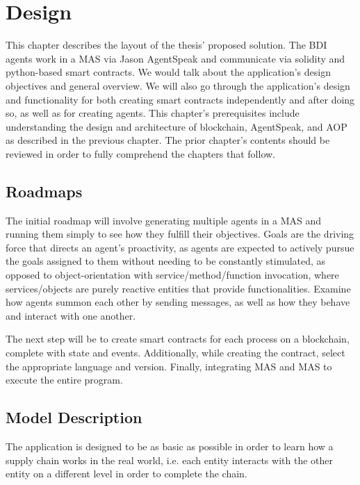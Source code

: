 \ifx\doclanguage\english
\chapter{Design}

This chapter describes the layout of the thesis' proposed solution. The \ac{BDI} agents work in a \ac{MAS} via Jason AgentSpeak and communicate via solidity and python-based smart contracts. We would talk about the application's design objectives and general overview. We will also go through the application's design and functionality for both creating smart contracts independently and after doing so, as well as for creating agents. This chapter's prerequisites include understanding the design and architecture of blockchain, AgentSpeak, and \ac{AOP} as described in the previous chapter. The prior chapter's contents should be reviewed in order to fully comprehend the chapters that follow.

\section{Roadmaps}

The initial roadmap will involve generating multiple agents in a \ac{MAS} and running them simply to see how they fulfill their objectives. Goals are the driving force that directs an agent's proactivity, as agents are expected to actively pursue the goals assigned to them without needing to be constantly stimulated, as opposed to object-orientation with service/method/function invocation, where services/objects are purely reactive entities that provide functionalities. Examine how agents summon each other by sending messages, as well as how they behave and interact with one another. 

\vspace{.5cm}

The next step will be to create smart contracts for each process on a blockchain, complete with state and events. Additionally, while creating the contract, select the appropriate language and version. Finally, integrating \ac{MAS} and \ac{MAS} to execute the entire program.

\section{Model Description}

The application is designed to be as basic as possible in order to learn how a supply chain works in the real world, i.e. each entity interacts with the other entity on a different level in order to complete the chain.

